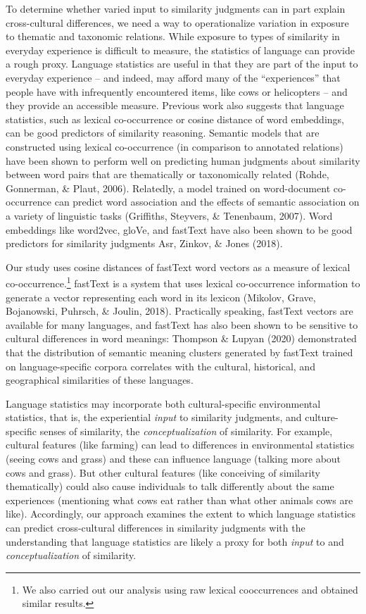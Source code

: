 \documentclass[10pt, letterpaper]{article}
\begin{document}
To determine whether varied input to similarity judgments can in part
explain cross-cultural differences, we need a way to operationalize
variation in exposure to thematic and taxonomic relations. While
exposure to types of similarity in everyday experience is difficult to
measure, the statistics of language can provide a rough proxy. Language
statistics are useful in that they are part of the input to everyday
experience -- and indeed, may afford many of the ``experiences'' that
people have with infrequently encountered items, like cows or
helicopters -- and they provide an accessible measure. Previous work
also suggests that language statistics, such as lexical co-occurrence or
cosine distance of word embeddings, can be good predictors of similarity
reasoning. Semantic models that are constructed using lexical
co-occurrence (in comparison to annotated relations) have been shown to
perform well on predicting human judgments about similarity between word
pairs that are thematically or taxonomically related (Rohde, Gonnerman,
\& Plaut, 2006). Relatedly, a model trained on word-document
co-occurrence can predict word association and the effects of semantic
association on a variety of linguistic tasks (Griffiths, Steyvers, \&
Tenenbaum, 2007). Word embeddings like word2vec, gloVe, and fastText
have also been shown to be good predictors for similarity judgments Asr,
Zinkov, \& Jones (2018).

Our study uses cosine distances of fastText word vectors as a measure of
lexical co-occurrence.\footnote{We also carried out our analysis using
  raw lexical cooccurrences and obtained similar results.} fastText is a
system that uses lexical co-occurrence information to generate a vector
representing each word in its lexicon (Mikolov, Grave, Bojanowski,
Puhrsch, \& Joulin, 2018). Practically speaking, fastText vectors are
available for many languages, and fastText has also been shown to be
sensitive to cultural differences in word meanings: Thompson \& Lupyan
(2020) demonstrated that the distribution of semantic meaning clusters
generated by fastText trained on language-specific corpora correlates
with the cultural, historical, and geographical similarities of these
languages.

Language statistics may incorporate both cultural-specific environmental
statistics, that is, the experiential \emph{input} to similarity
judgments, and culture-specific senses of similarity, the
\emph{conceptualization} of similarity. For example, cultural features
(like farming) can lead to differences in environmental statistics
(seeing cows and grass) and these can influence language (talking more
about cows and grass). But other cultural features (like conceiving of
similarity thematically) could also cause individuals to talk
differently about the same experiences (mentioning what cows eat rather
than what other animals cows are like). Accordingly, our approach
examines the extent to which language statistics can predict
cross-cultural differences in similarity judgments with the
understanding that language statistics are likely a proxy for both
\emph{input} to and \emph{conceptualization} of similarity.
\end{document}
